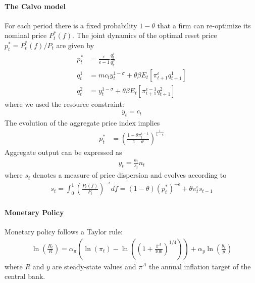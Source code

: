 \documentclass{article}
\numberwithin{equation}{section}
\begin{document}
\paragraph{The Calvo model}
For each period there is a fixed probability \(1-\theta \) that a firm can re-optimize its nominal price \(P_t^*(f)\).
The joint dynamics of the optimal reset price \(p_t^* = P_t^*(f)/P_t\) are given by
\begin{align}
p_t^* &= \frac{\epsilon}{\epsilon-1} \frac{q^1_t}{q^2_t} \label{eq:Calvo:OptimalPrice}
\\
q^1_t &= mc_t y_t^{1-\sigma} + \theta \beta E_t \left[\pi_{t+1}^\epsilon q^1_{t+1}\right] \label{eq:Calvo:OptimalPriceAux1}
\\
q^2_t &= y_t^{1-\sigma} + \theta \beta E_t \left[\pi_{t+1}^{\epsilon-1} q^2_{t+1}\right] \label{eq:Calvo:OptimalPriceAux2}
\end{align}
where we used the resource constraint:
\begin{align}
y_t = c_t \label{eq:Calvo:ResourceConstraint}
\end{align}
The evolution of the aggregate price index implies
\begin{align}
p_t^* &= {\left(\frac{1-\theta \pi_t^{\epsilon-1}}{1-\theta}\right)}^{\frac{1}{1-\epsilon}} \label{eq:Calvo:AggregatePriceIndex}
\end{align}
Aggregate output can be expressed as
\begin{align}
y_t = \frac{a_t}{s_t} n_t \label{eq:Calvo:AggregateSupply}
\end{align}
where \(s_t\) denotes a measure of price dispersion and evolves according to
\begin{align}
s_t = \int_0^1 {\left(\frac{P_t(f)}{P_t}\right)}^{-\epsilon}df = (1-\theta){(p_t^*)}^{-\epsilon} + \theta \pi_t^\epsilon s_{t-1} \label{eq:Calvo:PriceDispersion}
\end{align}

\paragraph{Monetary Policy}
Monetary policy follows a Taylor rule:
\begin{align}
\ln\left(\frac{R_t}{R}\right) = \alpha_\pi \left( \ln(\pi_t) - \ln\left({\left(1+\frac{\bar{\pi}^{A}}{100}\right)}^{1/4}\right) \right) + \alpha_y \ln\left(\frac{y_t}{y}\right) \label{eq:CalvoRotemberg:TaylorRule}
\end{align}
where \(R\) and \(y\) are steady-state values and \(\bar{\pi}^{A}\) the annual inflation target of the central bank.
\end{document}
